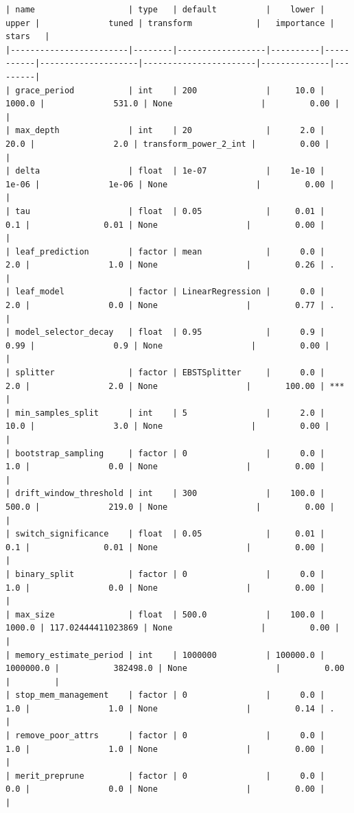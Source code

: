 \documentclass[
  letterpaper,
  DIV=11,
  numbers=noendperiod]{scrreprt}
\begin{document}
\begin{verbatim}
| name                   | type   | default          |    lower |     upper |              tuned | transform             |   importance | stars   |
|------------------------|--------|------------------|----------|-----------|--------------------|-----------------------|--------------|---------|
| grace_period           | int    | 200              |     10.0 |    1000.0 |              531.0 | None                  |         0.00 |         |
| max_depth              | int    | 20               |      2.0 |      20.0 |                2.0 | transform_power_2_int |         0.00 |         |
| delta                  | float  | 1e-07            |    1e-10 |     1e-06 |              1e-06 | None                  |         0.00 |         |
| tau                    | float  | 0.05             |     0.01 |       0.1 |               0.01 | None                  |         0.00 |         |
| leaf_prediction        | factor | mean             |      0.0 |       2.0 |                1.0 | None                  |         0.26 | .       |
| leaf_model             | factor | LinearRegression |      0.0 |       2.0 |                0.0 | None                  |         0.77 | .       |
| model_selector_decay   | float  | 0.95             |      0.9 |      0.99 |                0.9 | None                  |         0.00 |         |
| splitter               | factor | EBSTSplitter     |      0.0 |       2.0 |                2.0 | None                  |       100.00 | ***     |
| min_samples_split      | int    | 5                |      2.0 |      10.0 |                3.0 | None                  |         0.00 |         |
| bootstrap_sampling     | factor | 0                |      0.0 |       1.0 |                0.0 | None                  |         0.00 |         |
| drift_window_threshold | int    | 300              |    100.0 |     500.0 |              219.0 | None                  |         0.00 |         |
| switch_significance    | float  | 0.05             |     0.01 |       0.1 |               0.01 | None                  |         0.00 |         |
| binary_split           | factor | 0                |      0.0 |       1.0 |                0.0 | None                  |         0.00 |         |
| max_size               | float  | 500.0            |    100.0 |    1000.0 | 117.02444411023869 | None                  |         0.00 |         |
| memory_estimate_period | int    | 1000000          | 100000.0 | 1000000.0 |           382498.0 | None                  |         0.00 |         |
| stop_mem_management    | factor | 0                |      0.0 |       1.0 |                1.0 | None                  |         0.14 | .       |
| remove_poor_attrs      | factor | 0                |      0.0 |       1.0 |                1.0 | None                  |         0.00 |         |
| merit_preprune         | factor | 0                |      0.0 |       0.0 |                0.0 | None                  |         0.00 |         |
\end{verbatim}
\end{document}
